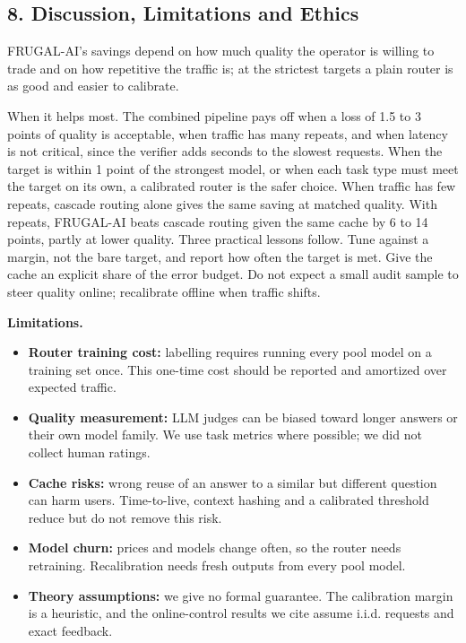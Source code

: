 \documentclass[
  10pt,
]{article}
\providecommand{\tightlist}{%
  \setlength{\itemsep}{0pt}\setlength{\parskip}{0pt}}
\begin{document}
\subsection{8. Discussion, Limitations and
Ethics}\label{discussion-limitations-and-ethics}

FRUGAL-AI's savings depend on how much quality the operator is willing
to trade and on how repetitive the traffic is; at the strictest targets
a plain router is as good and easier to calibrate.

When it helps most. The combined pipeline pays off when a loss of 1.5 to
3 points of quality is acceptable, when traffic has many repeats, and
when latency is not critical, since the verifier adds seconds to the
slowest requests. When the target is within 1 point of the strongest
model, or when each task type must meet the target on its own, a
calibrated router is the safer choice. When traffic has few repeats,
cascade routing alone gives the same saving at matched quality. With
repeats, FRUGAL-AI beats cascade routing given the same cache by 6 to 14
points, partly at lower quality. Three practical lessons follow. Tune
against a margin, not the bare target, and report how often the target
is met. Give the cache an explicit share of the error budget. Do not
expect a small audit sample to steer quality online; recalibrate offline
when traffic shifts.

\textbf{Limitations.}

\begin{itemize}
\tightlist
\item
  \textbf{Router training cost:} labelling requires running every pool
  model on a training set once. This one-time cost should be reported
  and amortized over expected traffic.
\item
  \textbf{Quality measurement:} LLM judges can be biased toward longer
  answers or their own model family. We use task metrics where possible;
  we did not collect human ratings.
\item
  \textbf{Cache risks:} wrong reuse of an answer to a similar but
  different question can harm users. Time-to-live, context hashing and a
  calibrated threshold reduce but do not remove this risk.
\item
  \textbf{Model churn:} prices and models change often, so the router
  needs retraining. Recalibration needs fresh outputs from every pool
  model.
\item
  \textbf{Theory assumptions:} we give no formal guarantee. The
  calibration margin is a heuristic, and the online-control results we
  cite assume i.i.d. requests and exact feedback.
\end{itemize}
\end{document}
